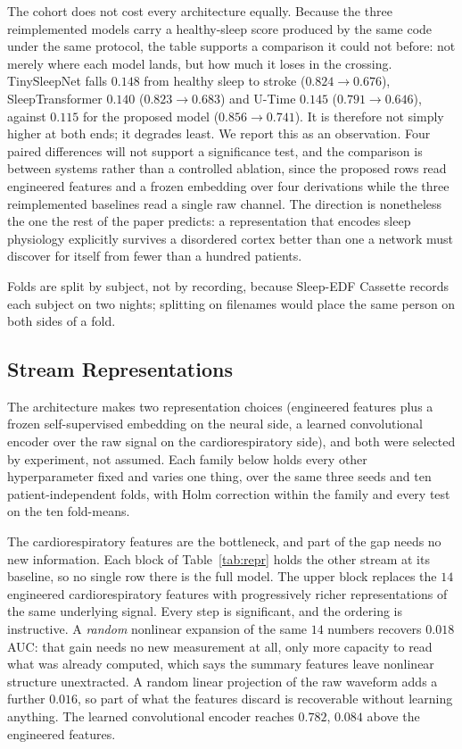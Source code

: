 \documentclass{ieeeaccess}
\begin{document}
The cohort does not cost every architecture equally. Because the three reimplemented
models carry a healthy-sleep score produced by the same code under the same protocol, the
table supports a comparison it could not before: not merely where each model lands, but how
much it loses in the crossing. TinySleepNet falls $0.148$ from healthy sleep to stroke
($0.824 \to 0.676$), SleepTransformer $0.140$ ($0.823 \to 0.683$) and U-Time $0.145$
($0.791 \to 0.646$), against $0.115$ for the proposed model ($0.856 \to 0.741$). It is therefore not simply higher at both ends; it
degrades least. We report this as an observation. Four paired differences
will not support a significance test, and the comparison is between systems rather than a controlled ablation, since the proposed rows read engineered features and a frozen embedding
over four derivations while the three reimplemented baselines read a single raw channel. The
direction is nonetheless the one the rest of the paper predicts: a representation that
encodes sleep physiology explicitly survives a disordered cortex better than one a network
must discover for itself from fewer than a hundred patients.

Folds are split by subject, not by recording, because Sleep-EDF Cassette records
each subject on two nights; splitting on filenames would place the same person on both
sides of a fold.



\subsection{Stream Representations}
\label{sec:repr}
The architecture makes two representation choices (engineered features plus a frozen
self-supervised embedding on the neural side, a learned convolutional encoder over the raw
signal on the cardiorespiratory side), and both were selected by experiment, not
assumed. Each family below holds every other hyperparameter fixed and varies one thing, over
the same three seeds and ten patient-independent folds, with Holm correction within the
family and every test on the ten fold-means.

The cardiorespiratory features are the bottleneck, and part of the gap needs no new
information. Each block of Table~\ref{tab:repr} holds the other stream at its baseline, so no single
row there is the full model. The upper block replaces the $14$ engineered cardiorespiratory features
with progressively richer representations of the same underlying signal. Every step is
significant, and the ordering is instructive. A \emph{random} nonlinear expansion of the same
$14$ numbers recovers $0.018$ AUC: that gain needs no new measurement at all, only more
capacity to read what was already computed, which says the summary features leave nonlinear
structure unextracted. A random linear projection of the raw waveform adds a further $0.016$,
so part of what the features discard is recoverable without learning anything. The learned
convolutional encoder reaches $0.782$, $0.084$ above the engineered features.
\end{document}
